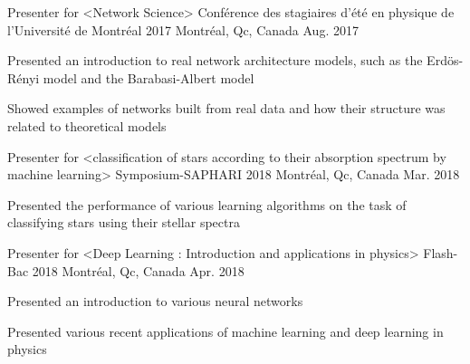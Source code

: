 \begin{cventries}
  \cventry
    {Presenter for <Network Science>}
    {Conférence des stagiaires d'été en physique de l'Université de Montréal 2017}
    {Montréal, Qc, Canada}
    {Aug. 2017}
    {
      \begin{cvitems}
        \item {Presented an introduction to real network architecture models, such as the Erdös-Rényi model and the Barabasi-Albert model}
        \item {Showed examples of networks built from real data and how their structure was related to theoretical models}
      \end{cvitems}
    }
  \cventry
    {Presenter for <classification of stars according to their absorption spectrum by machine learning>}
    {Symposium-SAPHARI 2018}
    {Montréal, Qc, Canada}
    {Mar. 2018}
    {
      \begin{cvitems}
      	\item {Presented the performance of various learning algorithms on the task of classifying stars using their stellar spectra}
      \end{cvitems}
    }
  \cventry
    {Presenter for <Deep Learning : Introduction and applications in physics>}
    {Flash-Bac 2018}
    {Montréal, Qc, Canada}
    {Apr. 2018}
    {
      \begin{cvitems}
        \item {Presented an introduction to various neural networks}
        \item {Presented various recent applications of machine learning and deep learning in physics}
      \end{cvitems}
    }
\end{cventries}

